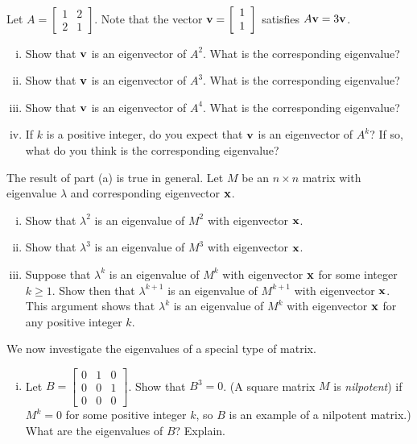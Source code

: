 \begin{example} ~
\ba
\item Let $A = \left[ \begin{array}{cc} 1&2\\2&1 \end{array} \right]$. Note that the vector $\mathbf{v} = \left[ \begin{array}{c}1\\1 \end{array} \right]$ satisfies $A \mathbf{v} = 3\mathbf{v}$. 
	\begin{enumerate}[i.]
	\item Show that $\mathbf{v}$ is an eigenvector of $A^2$. What is the corresponding eigenvalue?
	\item Show that $\mathbf{v}$ is an eigenvector of $A^3$. What is the corresponding eigenvalue?
	\item Show that $\mathbf{v}$ is an eigenvector of $A^4$. What is the corresponding eigenvalue?
	\item If $k$ is a positive integer, do you expect that $\mathbf{v}$ is an eigenvector of $A^k$? If so, what do you think is the corresponding eigenvalue?
	\end{enumerate}

\item The result of part (a) is true in general. Let $M$ be an $n \times n$ matrix with eigenvalue $\lambda$ and corresponding eigenvector $\mathbf{x}$.
	\begin{enumerate}[i.]
	\item Show that $\lambda^2$ is an eigenvalue of $M^2$ with eigenvector $\mathbf{x}$. 
	\item Show that $\lambda^3$ is an eigenvalue of $M^3$ with eigenvector $\mathbf{x}$. 
	\item Suppose that $\lambda^k$ is an eigenvalue of $M^k$ with eigenvector $\mathbf{x}$ for some integer $k \geq 1$. Show then that $\lambda^{k+1}$ is an eigenvalue of $M^{k+1}$ with eigenvector $\mathbf{x}$. This argument shows that $\lambda^k$ is an eigenvalue of $M^k$ with eigenvector $\mathbf{x}$ for any positive integer $k$. 
	\end{enumerate}

\item  We now investigate the eigenvalues of a special type of matrix. 
	\begin{enumerate}[i.]
	\item Let $B = \left[ \begin{array}{ccc} 0&1&0 \\ 0&0&1 \\ 0&0&0 \end{array} \right]$. Show that $B^3 = 0$. (A square matrix $M$ is \emph{nilpotent}) if $M^k = 0$ for some positive integer $k$, so $B$ is an example of a nilpotent matrix.) What are the eigenvalues of $B$? Explain. 


\end{enumerate}
\end{example}
